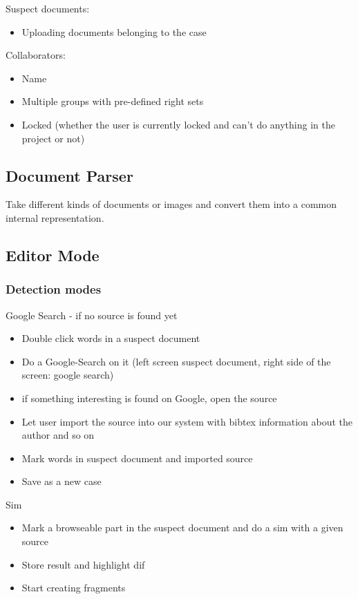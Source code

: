 Suspect documents:
\begin{itemize}
\item Uploading documents belonging to the case
\end{itemize}

Collaborators:
\begin{itemize}
\item Name
\item Multiple groups with pre-defined right sets
\item Locked (whether the user is currently locked and can't do anything in the project or not)
\end{itemize}


\subsection{ Document Parser}

Take different kinds of documents or images and convert them into a common internal representation.

\subsection{ Editor Mode}

\subsubsection{ Detection modes}

Google Search - if no source is found yet
\begin{itemize}
\item Double click words in a suspect document
\item Do a Google-Search on it (left screen suspect document, right side of the screen: google search)
\item if something interesting is found on Google, open the source
\item Let user import the source into our system with bibtex information about the author and so on
\item Mark words in suspect document and imported source
\item Save as a new case
\end{itemize}

Sim
\begin{itemize}
\item Mark a browseable part in the suspect document and do a sim with a given source
\item Store result and highlight dif
\item Start creating fragments
\end{itemize}

